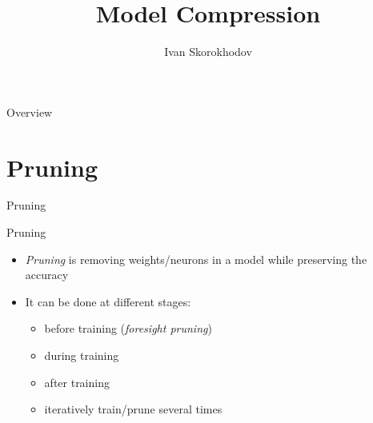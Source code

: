\documentclass[10pt, handout]{beamer}
\title{Model Compression}
\author{Ivan Skorokhodov}
\begin{document}
\begin{frame}
    \titlepage
\end{frame}

\begin{frame}{Overview}
    \tableofcontents
\end{frame}


\section{Pruning}
\begin{frame}
    Pruning
\end{frame}

\begin{frame}{Pruning}
    \begin{itemize}
        \pause\item \textit{Pruning} is removing weights/neurons in a model while preserving the accuracy
        \pause\item It can be done at different stages:
        \begin{itemize}
            \pause\item before training (\textit{foresight pruning})
            \pause\item during training
            \pause\item after training
            \pause\item iteratively train/prune several times
        \end{itemize}
    \end{itemize}
\end{frame}
\end{document}
